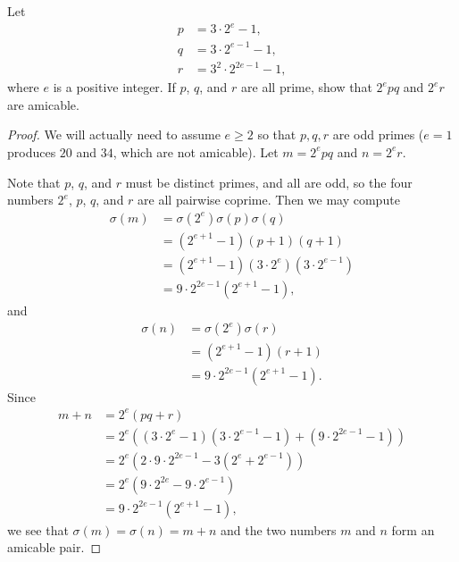  Let
\begin{align*}
  p &= 3\cdot2^e - 1, \\
  q &= 3\cdot2^{e-1} - 1, \\
  r &= 3^2\cdot2^{2e-1} - 1,
\end{align*}
where $e$ is a positive integer. If $p$, $q$, and $r$ are all prime,
show that $2^epq$ and $2^er$ are amicable.
\begin{proof}
  We will actually need to assume $e\geq2$ so that $p,q,r$ are odd
  primes ($e = 1$ produces $20$ and $34$, which are not
  amicable). Let $m = 2^epq$ and $n = 2^er$.

  Note that $p$, $q$, and $r$ must be distinct primes, and all are
  odd, so the four numbers $2^e$, $p$, $q$, and $r$ are all pairwise
  coprime. Then we may compute
  \begin{align*}
    \sigma(m)
    &= \sigma(2^e)\sigma(p)\sigma(q) \\
    &= (2^{e+1} - 1)(p + 1)(q + 1) \\
    &= (2^{e+1} - 1)(3\cdot2^e)(3\cdot2^{e-1}) \\
    &= 9\cdot2^{2e-1}(2^{e+1} - 1),
  \end{align*}
  and
  \begin{align*}
    \sigma(n)
    &= \sigma(2^e)\sigma(r) \\
    &= (2^{e+1} - 1)(r + 1) \\
    &= 9\cdot2^{2e-1}(2^{e+1} - 1).
  \end{align*}
  Since
  \begin{align*}
    m + n
    &= 2^e(pq + r) \\
    &= 2^e((3\cdot2^e - 1)(3\cdot2^{e-1} - 1) + (9\cdot2^{2e-1} - 1)) \\
    &= 2^e(2\cdot9\cdot2^{2e-1} - 3(2^e + 2^{e-1})) \\
    &= 2^e(9\cdot2^{2e} - 9\cdot2^{e-1}) \\
    &= 9\cdot2^{2e-1}(2^{e+1} - 1),
  \end{align*}
  we see that $\sigma(m) = \sigma(n) = m + n$ and the two numbers $m$
  and $n$ form an amicable pair.
\end{proof}
